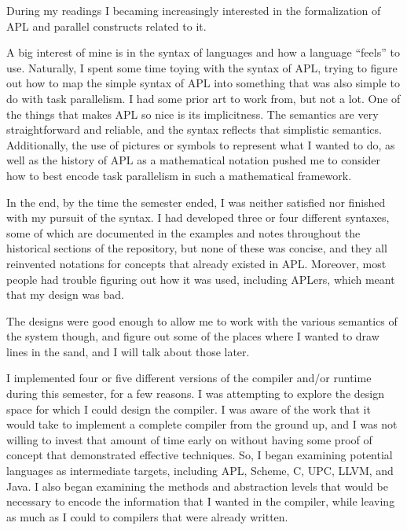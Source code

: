 \noindent During my readings I becaming increasingly interested in the 
formalization of APL and parallel constructs related to it. 

A big interest of mine is in the syntax 
of languages and how a language ``feels'' to use. Naturally, I spent some 
time toying with the syntax of APL, trying to figure out how to map 
the simple syntax of APL into something that was also simple to do with 
task parallelism. I had some prior art to work from, but not a lot. 
One of the things that makes APL so nice is its implicitness. The semantics 
are very straightforward and reliable, and the syntax reflects that 
simplistic semantics. Additionally, the use of pictures or symbols to 
represent what I wanted to do, as well as the history of APL as a 
mathematical notation pushed me to consider how to best encode task 
parallelism in such a mathematical framework.

In the end, by the time the semester ended, I was neither satisfied nor 
finished with my pursuit of the syntax. I had developed three or four 
different syntaxes, some of which are documented in the examples and notes 
throughout the historical sections of the repository, but none of these 
was concise, and they all reinvented notations for concepts that already 
existed in APL. Moreover, most people had trouble figuring out how it 
was used, including APLers, which meant that my design was bad. 

The designs were good enough to allow me to work with the various semantics 
of the system though, and figure out some of the places where I wanted 
to draw lines in the sand, and I will talk about those later.

I implemented four or five different versions of the compiler and/or 
runtime during this semester, for a few reasons. I was attempting to 
explore the design space for which I could design the compiler. I was 
aware of the work that it would take to implement a complete compiler 
from the ground up, and I was not willing to invest that amount of time 
early on without having some proof of concept that demonstrated effective 
techniques. So, I began examining potential languages as intermediate 
targets, including APL, Scheme, C, UPC, LLVM, and Java. 
I also began examining 
the methods and abstraction levels that would be necessary to encode 
the information that I wanted in the compiler, while leaving as much 
as I could to compilers that were already written. 

